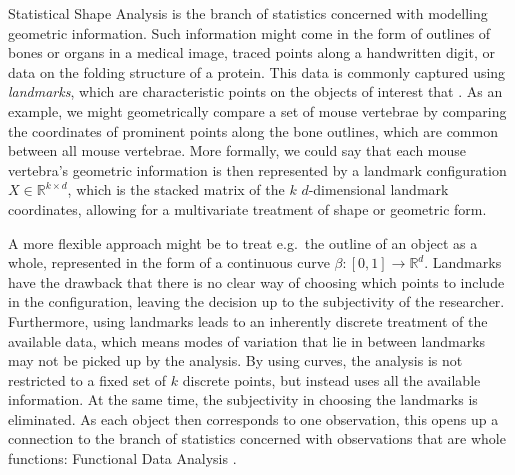 \label{sec:1}
Statistical Shape Analysis \parencite[see e.g.][]{DrydenMardia2016} is the branch of statistics concerned with modelling geometric information.
Such information might come in the form of outlines of bones or organs in a medical image, traced points along a handwritten digit, or data on the folding structure of a protein.
This data is commonly captured using \emph{landmarks}, which are characteristic points on the objects of interest that .
As an example, we might geometrically compare a set of mouse vertebrae by comparing the coordinates of prominent points along the bone outlines, which are common between all mouse vertebrae.
More formally, we could say that each mouse vertebra's geometric information is then represented by a landmark configuration $X \in \mathbb{R}^{k \times d}$, which is the stacked matrix of the $k$ $d$-dimensional landmark coordinates, allowing for a multivariate treatment of shape or geometric form.

A more flexible approach might be to treat e.g.\ the outline of an object as a whole, represented in the form of a continuous curve $\beta : [0,1] \rightarrow \mathbb{R}^d$. 
Landmarks have the drawback that there is no clear way of choosing which points to include in the configuration, leaving the decision up to the subjectivity of the researcher. 
Furthermore, using landmarks leads to an inherently discrete treatment of the available data, which means modes of variation that lie in between landmarks may not be picked up by the analysis.  
By using curves, the analysis is not restricted to a fixed set of $k$ discrete points, but instead uses all the available information.
At the same time, the subjectivity in choosing the landmarks is eliminated.
As each object then corresponds to one observation, this opens up a connection to the branch of statistics concerned with observations that are whole functions: Functional Data Analysis \parencite[see e.g.][]{RamsaySilverman2005}.

